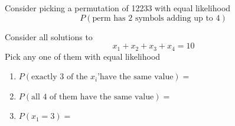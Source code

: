 \begin{exercise}
    Consider picking a permutation of 12233 with equal likelihood
    \[
    P(\text{perm has 2 symbols adding up to 4})
    \]
\end{exercise}

\begin{exercise}
    Consider all solutions to 
    \[
    x_1 + x_2 + x_3 + x_4 = 10
    \]
    Pick any one of them with equal likelihood
    \begin{enumerate}
        \item $P(\text{exactly 3 of the $x_i$'have the same value}) = $
        \item $P(\text{all 4 of them have the same value}) =$
        \item $P(x_1 = 3) = $
    \end{enumerate}
\end{exercise}



